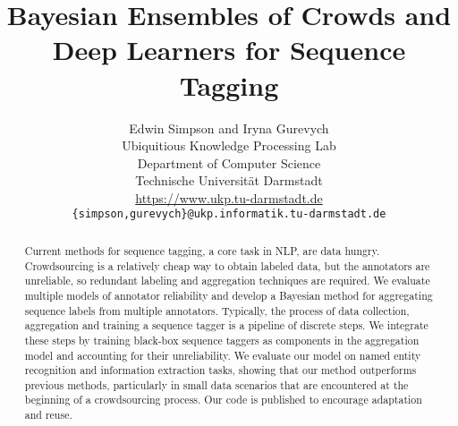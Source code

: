 \documentclass[11pt,a4paper]{article}
\title{Bayesian Ensembles of Crowds and Deep Learners for Sequence Tagging}%
\author{Edwin Simpson and Iryna Gurevych\\
  Ubiquitious Knowledge Processing Lab \\
  Department of Computer Science \\
  Technische Universit\"at Darmstadt \\
  \url{https://www.ukp.tu-darmstadt.de} \\
  {\tt \{simpson,gurevych\}@ukp.informatik.tu-darmstadt.de}
}
\begin{document}
\maketitle


\begin{abstract}
Current methods for sequence tagging, a core task in NLP, are data hungry.
Crowdsourcing is a relatively cheap way to obtain labeled data, but
the annotators are unreliable, so redundant labeling
and aggregation techniques are required.
We evaluate multiple models of annotator reliability and develop
 a Bayesian method for aggregating sequence labels from multiple annotators.
Typically, the process of data collection, aggregation and training a sequence tagger 
is a pipeline of discrete steps.
We integrate these steps by training black-box sequence taggers as components in the aggregation model and
accounting for their unreliability.
We evaluate our model on named entity recognition and information extraction tasks,
showing that our method outperforms previous methods, particularly in small data scenarios that
are encountered at the beginning of a crowdsourcing process.
Our code is published to encourage adaptation and reuse.



\end{abstract}
\end{document}
